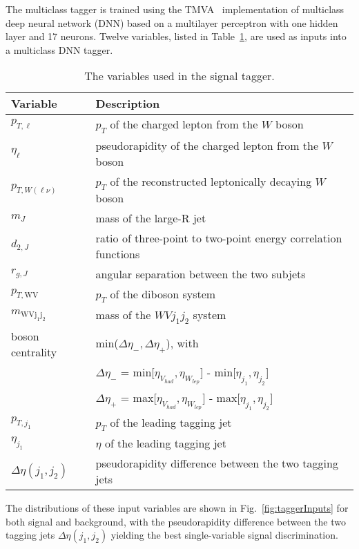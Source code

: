 \documentclass[amsmath,amssymb,aps,prd,preprint,groupedaddress]{revtex4-2}
\begin{document}
The multiclass tagger is trained using the TMVA~\cite{Hoecker2007TMVAT} implementation of multiclass deep neural network (DNN) based on a multilayer perceptron with one hidden layer and 17 neurons.
Twelve variables, listed in Table~\ref{tab:taggerInputs}, are used as inputs into a multiclass DNN tagger.
\begin{table}[ht]
\centering
\caption{The variables used in the signal tagger.}
\label{tab:taggerInputs}
\begin{tabular}[t]{ll}
\hline
Variable & Description\\
\hline
$p_{T,\ell}$                     & $p_T$ of the charged lepton from the $W$ boson \\
$\eta_{\ell}$                     &  pseudorapidity of the charged lepton from the $W$ boson \\
$p_{T,W(\ell\nu)}$                  &  $p_T$ of the reconstructed leptonically decaying $W$ boson \\
$m_{J}$                          &  mass of the large-R jet\\
$d_{2,J}$                            &  ratio of three-point to two-point energy correlation functions\\
$r_{g,J}$                            &  angular separation between the two subjets\\
$p_{T, \mathrm{WV}}$                      &  $p_T$ of the diboson system\\
$m_{\mathrm{WVj_{1}j_{2}}}$                       &  mass of the $WVj_{1}j_{2}$ system\\
boson centrality                 &  min($\Delta \eta_{-}, \Delta \eta_{+}$), with\\
                                 &  $\Delta \eta_{-}$ = min[$\eta_{V_{had}}, \eta_{W_{lep}}$] - min[$\eta_{j_{1}}, \eta_{j_{2}}$]\\
                                 &  $\Delta \eta_{+}$ = max[$\eta_{V_{had}}, \eta_{W_{lep}}$] - max[$\eta_{j_{1}}, \eta_{j_{2}}$]\\
$p_{T,j_{1}}$                       &  $p_T$ of the leading tagging jet\\
$\eta_{j_{1}}$                      &  $\eta$ of the leading tagging jet\\
$\Delta \eta (j_{1}, j_{2})$             &  pseudorapidity difference between the two tagging jets\\
\hline
\end{tabular}
\end{table}
The distributions of these input variables are shown in Fig.~\ref{fig:taggerInputs} for both signal and background, with the pseudorapidity difference between the two tagging jets $\Delta \eta (j_{1}, j_{2})$ yielding the best single-variable signal discrimination.
\end{document}
